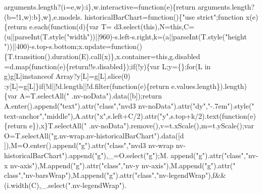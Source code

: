 \begin{DoxyCode}
      arguments.length?(i=e,w):i\},w.interactive=\textcolor{keyword}{function}(e)\{\textcolor{keywordflow}{return} arguments.length?(b=!1,w):b\},w\},e.models.
      historicalBarChart=\textcolor{keyword}{function}()\{\textcolor{stringliteral}{"use strict"};\textcolor{keyword}{function} x(e)\{\textcolor{keywordflow}{return} e.each(\textcolor{keyword}{function}(d)\{var T=
      d3.select(\textcolor{keyword}{this}),N=\textcolor{keyword}{this},C=(u||parseInt(T.style(\textcolor{stringliteral}{"width"}))||960)-s.left-s.right,k=(a||parseInt(T.style(\textcolor{stringliteral}{"height
      "}))||400)-s.top-s.bottom;x.update=\textcolor{keyword}{function}()\{T.transition().duration(E).call(x)\},x.container=\textcolor{keyword}{this},g.disabled
      =d.map(\textcolor{keyword}{function}(e)\{\textcolor{keywordflow}{return}!!e.disabled\});\textcolor{keywordflow}{if}(!y)\{var L;y=\{\};\textcolor{keywordflow}{for}(L in g)g[L]instanceof Array?y[L]=g[L].slice(0)
      :y[L]=g[L]\}\textcolor{keywordflow}{if}(!d||!d.length||!d.filter(\textcolor{keyword}{function}(e)\{return e.values.length\}).length)\{var A=T.selectAll(\textcolor{stringliteral}{"
      .nv-noData"}).data([b]);\textcolor{keywordflow}{return} A.enter().append(\textcolor{stringliteral}{"text"}).attr(\textcolor{stringliteral}{"class"},\textcolor{stringliteral}{"nvd3 nv-noData"}).attr(\textcolor{stringliteral}{"dy"},\textcolor{stringliteral}{"-.7em"}).style(\textcolor{stringliteral}{"
      text-anchor"},\textcolor{stringliteral}{"middle"}),A.attr(\textcolor{stringliteral}{"x"},s.left+C/2).attr(\textcolor{stringliteral}{"y"},s.top+k/2).text(\textcolor{keyword}{function}(e)\{\textcolor{keywordflow}{return} e\}),x\}T.selectAll(\textcolor{stringliteral}{"
      .nv-noData"}).remove(),v=t.xScale(),m=t.yScale();var O=T.selectAll(\textcolor{stringliteral}{"g.nv-wrap.nv-historicalBarChart"}).data([d
      ]),M=O.enter().append(\textcolor{stringliteral}{"g"}).attr(\textcolor{stringliteral}{"class"},\textcolor{stringliteral}{"nvd3 nv-wrap nv-historicalBarChart"}).append(\textcolor{stringliteral}{"g"}),\_=O.select(\textcolor{stringliteral}{"g"});M.
      append(\textcolor{stringliteral}{"g"}).attr(\textcolor{stringliteral}{"class"},\textcolor{stringliteral}{"nv-x nv-axis"}),M.append(\textcolor{stringliteral}{"g"}).attr(\textcolor{stringliteral}{"class"},\textcolor{stringliteral}{"nv-y nv-axis"}),M.append(\textcolor{stringliteral}{"g"}).attr(\textcolor{stringliteral}{"
      class"},\textcolor{stringliteral}{"nv-barsWrap"}),M.append(\textcolor{stringliteral}{"g"}).attr(\textcolor{stringliteral}{"class"},\textcolor{stringliteral}{"nv-legendWrap"}),f&&(i.width(C),\_.select(\textcolor{stringliteral}{".nv-legendWrap"}).

\end{DoxyCode}
